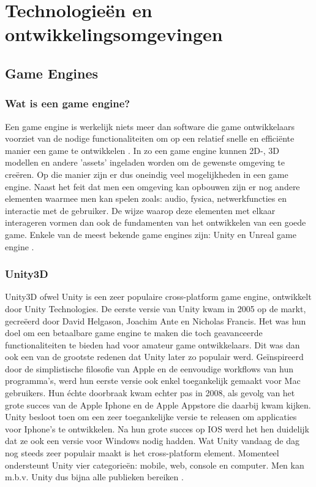 \section{Technologieën en ontwikkelingsomgevingen}
\subsection{Game Engines}
\subsubsection{Wat is een game engine?}
Een game engine is werkelijk niets meer dan software die game ontwikkelaars voorziet van de nodige functionaliteiten om op een relatief snelle en efficiënte manier een game te ontwikkelen \autocite{Oculus2017}. In zo een game engine kunnen 2D-, 3D modellen en andere 'assets' ingeladen worden om de gewenste omgeving te creëren. Op die manier zijn er dus oneindig veel mogelijkheden in een game engine. Naast het feit dat men een omgeving kan opbouwen zijn er nog andere elementen waarmee men kan spelen zoals: audio, fysica, netwerkfuncties en interactie met de gebruiker. De wijze  waarop deze elementen met elkaar interageren vormen dan ook de fundamenten van het ontwikkelen van een goede game. Enkele van de meest bekende game engines zijn: Unity en Unreal game engine \autocite{Staff2018}.

\subsubsection{Unity3D}

Unity3D ofwel Unity is een zeer populaire cross-platform game engine, ontwikkelt door Unity Technologies.
De eerste versie van Unity kwam in 2005 op de markt, gecreëerd door David Helgason, Joachim Ante en Nicholas Francis. Het was hun doel om een betaalbare game engine te maken die toch geavanceerde functionaliteiten te bieden had voor amateur game ontwikkelaars. Dit was dan ook een van de grootste redenen dat Unity later zo populair werd. Geïnspireerd door de simplistische filosofie van Apple en de eenvoudige workflows van hun programma's, werd hun eerste versie ook enkel toegankelijk gemaakt voor Mac gebruikers. Hun échte doorbraak kwam echter pas in 2008, als gevolg van het grote succes van de Apple Iphone en de Apple Appstore die daarbij kwam kijken. Unity besloot toen om een zeer toegankelijke versie te releasen om applicaties voor Iphone's te ontwikkelen. Na hun grote succes op IOS werd het hen duidelijk dat ze ook een versie voor Windows nodig hadden. Wat Unity vandaag de dag nog steeds zeer populair maakt is het cross-platform element. Momenteel ondersteunt Unity vier categorieën: mobile, web, console en computer. Men kan m.b.v. Unity dus bijna alle publieken bereiken \autocite{Haas2014}.

